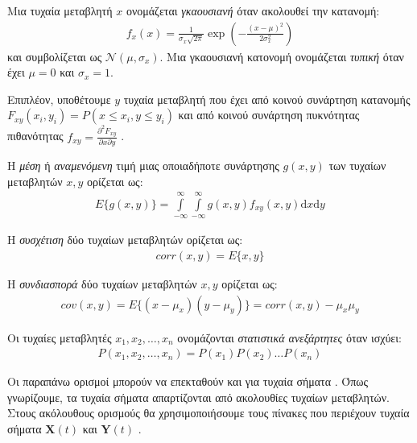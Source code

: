 \gr
\begin{definition} \label{def:1.11}
Μια τυχαία μεταβλητή \en $x$ \gr ονομάζεται \emph{γκαουσιανή} όταν ακολουθεί την κατανομή: \en
\begin{align*}
    f_x(x) = \frac{1}{\sigma_x \sqrt{2 \pi}} \exp \left( - \frac{(x-\mu)^2} {2 \sigma_x^2} \right )
\end{align*} \gr
και συμβολίζεται ως \en $\mathcal{N}(\mu,\sigma_x)$. \gr Μια γκαουσιανή κατονομή ονομάζεται \emph{τυπική} όταν έχει $μ = 0$ και \en $\sigma_x = 1$. \gr
\end{definition}
Επιπλέον, υποθέτουμε \en $y$ \gr τυχαία μεταβλητή που έχει από κοινού συνάρτηση κατανομής \en $F_{xy}(x_i,y_i) = P\left(x \leq x_i,y \leq y_i \right)$ \gr και από κοινού συνάρτηση πυκνότητας πιθανότητας \en $f_{xy} = \frac{\partial^2 F_{xy}}{\partial x \partial y}  $ \gr.
\begin{definition} \label{def:1.12}
Η \emph{μέση} ή \emph{αναμενόμενη} τιμή μιας οποιαδήποτε  συνάρτησης \en $g(x,y)$ \gr των τυχαίων μεταβλητών \en $x,y$ \gr ορίζεται ως: \en
\begin{align*}
    E\{g(x,y)\} = \int\limits_{-\infty}^{\infty} \int\limits_{-\infty}^{\infty} g(x,y) f_{xy}(x,y) \mathrm{d}x \mathrm{d}y
\end{align*} \gr
\end{definition}
\begin{definition} \label{def:1.13}
Η \emph{συσχέτιση} δύο τυχαίων μεταβλητών ορίζεται ως: \en
\begin{align*}
    corr(x,y)=E\{x,y\} 
\end{align*} 
\end{definition}
\gr
\begin{definition} \label{def:1.14}
Η \emph{συνδιασπορά} δύο τυχαίων μεταβλητών \en $x,y$ \gr ορίζεται ως: \en
\begin{align*}
    cov(x,y) = E\{ (x-\mu_x)(y-\mu_y)\} = corr(x,y) - \mu_x \mu_y
\end{align*}
\end{definition}
\gr
\begin{definition} \label{def:1.15}
Οι τυχαίες μεταβλητές \en $x_1, x_2, \ldots, x_n$ \gr ονομάζονται \emph{στατιστικά ανεξάρτητες} όταν ισχύει:
\begin{align*}
    P(x_1,x_2,\ldots,x_n) = P(x_1) P(x_2) \ldots P(x_n)
\end{align*}
\end{definition}
Οι παραπάνω ορισμοί μπορούν να επεκταθούν και για τυχαία σήματα \cite{prob:16}. Όπως γνωρίζουμε, τα τυχαία σήματα απαρτίζονται από ακολουθίες τυχαίων μεταβλητών. Στους ακόλουθους ορισμούς θα χρησιμοποιήσουμε τους πίνακες που περιέχουν τυχαία σήματα \en $\mathbf{X}(t)$ \gr και \en $\mathbf{Y}(t)$ \gr. 
